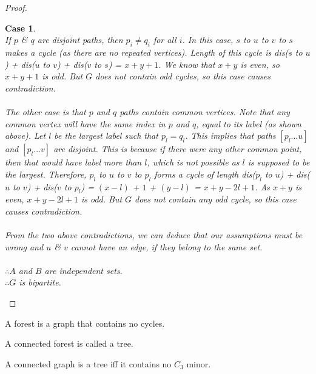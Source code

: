 \documentclass{article}
\newtheorem{case}{Case}
\begin{document}
\begin{proof}
\begin{case}
        \\
        If $p$ \& $q$ are disjoint paths, then $p_{i}\ne q_{i}$ for all $i$. In this case, $s$ to $u$ to $v$ to $s$ makes a cycle (as there are no repeated vertices). Length of this cycle is dis($s$ to $u$) + dis($u$ to $v$) + dis($v$ to $s$) = $x+y+1$. We know that $x+y$ is even, so $x+y+1$ is odd. But $G$ does not contain odd cycles, so this case causes contradiction.\\
        \\
        The other case is that $p$ and $q$ paths contain common vertices. Note that any common vertex will have the same index in $p$ and $q$, equal to its label (as shown above). Let $l$ be the largest label such that $p_{l}=q_{l}$. This implies that paths $[p_{l} \dots u]$ and $[p_{l} \dots v]$ are disjoint. This is because if there were any other common point, then that would have label more than $l$, which is not possible as $l$ is supposed to be the largest. Therefore, $p_{l}$ to $u$ to $v$ to $p_{l}$ forms a cycle of length dis($p_{l}$ to $u$) + dis($u$ to $v$) + dis($v$ to $p_{l}$) = $(x-l)$ + $1$ + $(y-l)$ = $x+y-2l+1$. As $x+y$ is even, $x+y-2l+1$ is odd. But $G$ does not contain any odd cycle, so this case causes contradiction.\\
        \\
        From the two above contradictions, we can deduce that our assumptions must be wrong and $u$ \& $v$ cannot have an edge, if they belong to the same set.\\
        \\
        $\therefore A$ and $B$ are independent sets.\\
        $\therefore G$ is bipartite.
    \end{case}
\end{proof}
  
\begin{definition}
    A forest is a graph that contains no cycles.
\end{definition}
\begin{definition}
    A connected forest is called a tree.
\end{definition}
\begin{theorem}
    A connected graph is a tree iff it contains no {$C_3$} minor.
\end{theorem}
\end{document}
